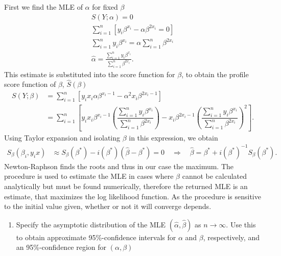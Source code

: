 First we find the MLE of $\alpha$ for fixed $\beta$
\begin{align*}
    S\left( Y; \alpha \right) = 0 \\
    \sum_{i=1}^{n} \left[ y_i \beta^{x_i} - \alpha \beta^{2 x_i} = 0 \right] \\
    \sum_{i=1}^{n} y_i \beta^{x_i} = \alpha \sum_{i=1}^{n} \beta^{2 x_i} \\
    \hat{\alpha} = \frac{\sum_{i=1}^{n} y_i \beta^{x_i}}{\sum_{i=1}^{n} \beta^{2x_i}}.
\end{align*}
This estimate is substituted into the score function for $\beta$, to obtain the profile score function of $\beta$, $\hat{S}(\beta)$
\begin{align*}
    S\left( Y; \beta \right) &= \sum_{i=1}^n \left[ y_i x_i \alpha \beta^{x_i - 1} - \alpha^2 x_i \beta^{2 x_i - 1} \right]\\
     &= \sum_{i=1}^n \left[ y_i x_i \beta^{x_i - 1} \left( \dfrac{\sum_{i=1}^n y_i\beta^{x_i}}{\sum_{i=1}^n \beta^{2x_i}}\right) - x_i\beta^{2x_i-1} \left( \dfrac{\sum_{i=1}^n y_i\beta^{x_i}}{\sum_{i=1}^n \beta^{2x_i}}\right)^2 \right].
\end{align*}
Using Taylor expansion and isolating $\beta$ in this expression, we obtain
\begin{align*}
    S_\beta (\beta_i, y_i x) &\approx S_\beta(\beta^*) - i(\beta^*) (\hat{\beta} - \beta^*) = 0 \quad \Rightarrow \quad
    \hat{\beta} = \beta^* + i(\beta^*)^{-1} S_\beta (\beta^*).
\end{align*}
Newton-Raphson finds the roots and thus in our case the maximum. 
The procedure is used to estimate the MLE in cases where $\beta$ cannot be calculated analytically but must be found numerically, therefore the returned MLE is an estimate, that maximizes the log likelihood function.  
As the procedure is sensitive to the initial value given, whether or not it will converge depends.

\begin{enumerate}[resume]
    \item Specify the asymptotic distribution of the MLE $(\hat{\alpha}, \hat{\beta})$ as $n \rightarrow \infty$.
    Use this to obtain approximate 95\%-confidence intervals for $\alpha$ and $\beta$, respectively, and an 95\%-confidence region for $(\alpha, \beta)$
\end{enumerate}

